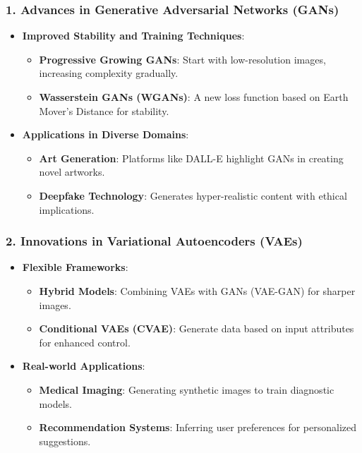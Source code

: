 \documentclass[aspectratio=169]{beamer}
\begin{document}
\begin{frame}[fragile]
    \frametitle{1. Advances in Generative Adversarial Networks (GANs)}
    \begin{itemize}
        \item \textbf{Improved Stability and Training Techniques}:
        \begin{itemize}
            \item \textbf{Progressive Growing GANs}: 
            Start with low-resolution images, increasing complexity gradually.
            \item \textbf{Wasserstein GANs (WGANs)}: 
            A new loss function based on Earth Mover's Distance for stability.
        \end{itemize}
        \item \textbf{Applications in Diverse Domains}:
        \begin{itemize}
            \item \textbf{Art Generation}: Platforms like DALL-E highlight GANs in creating novel artworks.
            \item \textbf{Deepfake Technology}: Generates hyper-realistic content with ethical implications.
        \end{itemize}
    \end{itemize}
\end{frame}

\begin{frame}[fragile]
    \frametitle{2. Innovations in Variational Autoencoders (VAEs)}
    \begin{itemize}
        \item \textbf{Flexible Frameworks}:
        \begin{itemize}
            \item \textbf{Hybrid Models}: 
            Combining VAEs with GANs (VAE-GAN) for sharper images.
            \item \textbf{Conditional VAEs (CVAE)}: 
            Generate data based on input attributes for enhanced control.
        \end{itemize}
        \item \textbf{Real-world Applications}:
        \begin{itemize}
            \item \textbf{Medical Imaging}: 
            Generating synthetic images to train diagnostic models.
            \item \textbf{Recommendation Systems}: 
            Inferring user preferences for personalized suggestions.
        \end{itemize}
    \end{itemize}
\end{frame}
\end{document}
